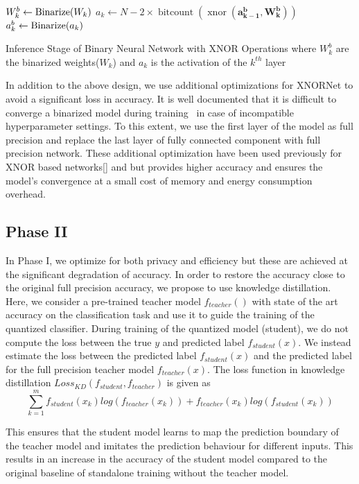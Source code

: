 \begin{algorithm}
\begin{algorithmic}
        \STATE $W_k^b \leftarrow {\rm Binarize}(W_k)$
        \STATE $a_k \leftarrow N - 2\times\operatorname{bitcount}(\operatorname{xnor}(\mathbf{a_{k-1}^b}, \mathbf{W_k^b}))$
            \STATE $a_k^b \leftarrow {\rm Binarize}(a_k)$
        \ENDIF
    \ENDFOR
\end{algorithmic}
\caption{Inference Stage of Binary Neural Network with XNOR Operations where $W_k^b$ are the binarized weights($W_k$) and $a_k$ is the activation of the $k^{th}$ layer}
\label{alg:inference}
\end{algorithm}



In addition to the above design, we use additional optimizations for XNORNet to avoid a significant loss in accuracy.
It is well documented that it is difficult to converge a binarized model during training~\cite{AAAI1714619} in case of incompatible hyperparameter settings.
To this extent, we use the first layer of the model as full precision and replace the last layer of fully connected component with full precision network.
These additional optimization have been used previously for XNOR based networks[] and but provides higher accuracy and ensures the model's convergence at a small cost of memory and energy consumption overhead.



\subsection{Phase II}

In Phase I, we optimize for both privacy and efficiency but these are achieved at the significant degradation of accuracy.
In order to restore the accuracy close to the original full precision accuracy, we propose to use knowledge distillation.
Here, we consider a pre-trained teacher model $f_{teacher}()$ with state of the art accuracy on the classification task and use it to guide the training of the quantized classifier.
During training of the quantized model (student), we do not compute the loss between the true $y$ and predicted label $f_{student}(x)$.
We instead estimate the loss between the predicted label $f_{student}(x)$ and the predicted label for the full precision teacher model $f_{teacher}(x)$.
The loss function in knowledge distillation $Loss_{KD} (f_{student}, f_{teacher})$ is given as
\begin{equation}
\sum _{k=1}^m f_{student}(x_k)log(f_{teacher}(x_k)) + f_{teacher}(x_k)log(f_{student}(x_k))
\end{equation}

This ensures that the student model learns to map the prediction boundary of the teacher model and imitates the prediction behaviour for different inputs.
This results in an increase in the accuracy of the student model compared to the original baseline of standalone training without the teacher model.
